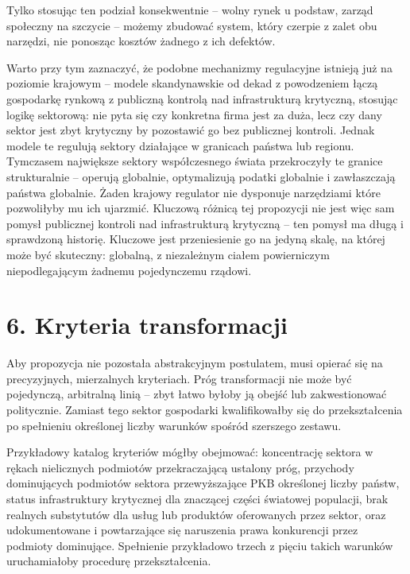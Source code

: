 \documentclass[12pt,a4paper]{article}
\begin{document}
Tylko stosując ten podział konsekwentnie -- wolny rynek u podstaw, zarząd
społeczny na szczycie -- możemy zbudować system, który czerpie z zalet obu
narzędzi, nie ponosząc kosztów żadnego z ich defektów.

Warto przy tym zaznaczyć, że podobne mechanizmy regulacyjne istnieją już
na poziomie krajowym -- modele skandynawskie od dekad z powodzeniem
łączą gospodarkę rynkową z publiczną kontrolą nad infrastrukturą krytyczną,
stosując logikę sektorową: nie pyta się czy konkretna firma jest za duża,
lecz czy dany sektor jest zbyt krytyczny by pozostawić go bez publicznej
kontroli. Jednak modele te regulują sektory działające w granicach państwa
lub regionu. Tymczasem największe sektory współczesnego świata przekroczyły
te granice strukturalnie -- operują globalnie, optymalizują podatki globalnie
i zawłaszczają państwa globalnie. Żaden krajowy regulator nie dysponuje
narzędziami które pozwoliłyby mu ich ujarzmić. Kluczową różnicą tej
propozycji nie jest więc sam pomysł publicznej kontroli nad infrastrukturą
krytyczną -- ten pomysł ma długą i sprawdzoną historię. Kluczowe jest
przeniesienie go na jedyną skalę, na której może być skuteczny: globalną,
z niezależnym ciałem powierniczym niepodlegającym żadnemu pojedynczemu
rządowi.

\section*{6. Kryteria transformacji}

Aby propozycja nie pozostała abstrakcyjnym postulatem, musi opierać się
na precyzyjnych, mierzalnych kryteriach. Próg transformacji nie może być
pojedynczą, arbitralną linią -- zbyt łatwo byłoby ją obejść lub zakwestionować
politycznie. Zamiast tego sektor gospodarki kwalifikowałby się do
przekształcenia po spełnieniu określonej liczby warunków spośród szerszego
zestawu.

Przykładowy katalog kryteriów mógłby obejmować: koncentrację sektora
w rękach nielicznych podmiotów przekraczającą ustalony próg, przychody
dominujących podmiotów sektora przewyższające PKB określonej liczby państw,
status infrastruktury krytycznej dla znaczącej części światowej populacji,
brak realnych substytutów dla usług lub produktów oferowanych przez sektor,
oraz udokumentowane i powtarzające się naruszenia prawa konkurencji przez
podmioty dominujące. Spełnienie przykładowo trzech z pięciu takich warunków
uruchamiałoby procedurę przekształcenia.
\end{document}
